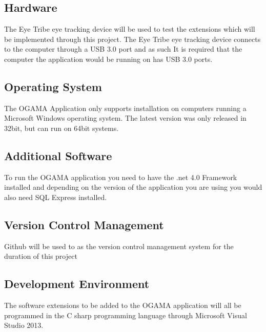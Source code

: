 \subsection{Hardware}
The Eye Tribe eye tracking device will be used to test the extensions which will be implemented through this project. The Eye Tribe eye tracking device  connects to the computer through a USB 3.0 port and as such It is required that the computer the application would be running on has USB 3.0 ports. 
\subsection{Operating System}
The OGAMA Application only supports installation on computers running a Microsoft Windows operating system. The latest version was only released in 32bit, but can run on 64bit systems.
\subsection{Additional Software}
To run the OGAMA application you need to have the .net 4.0 Framework installed and depending on the version of the application you are using you would also need SQL Express installed.
\subsection{Version Control Management}
Github will be used to as the version control management system for the duration of this project
\subsection{Development Environment}
The software extensions to be added to the OGAMA application will all be programmed in the C sharp programming language through Microsoft Visual Studio 2013.
